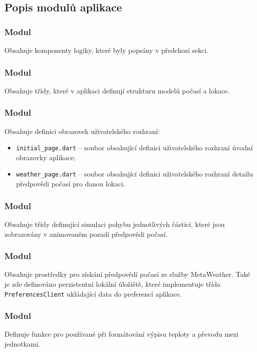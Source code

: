 \documentclass[12pt, a4paper]{article}
\begin{document}
\subsection{Popis modulů aplikace}

\subsubsection{Modul }
Obsahuje komponenty logiky, které byly popsány v předchozí sekci.

\subsubsection{Modul }
Obsahuje třídy, které v aplikaci definují strukturu modelů počasí a lokace.

\subsubsection{Modul }
Obsahuje definici obrazovek uživatelského rozhraní:

\begin{itemize}
	\item \texttt{initial\_page.dart} -- soubor obsahující definici uživatelského rozhraní úvodní obrazovky aplikace;
	\item \texttt{weather\_page.dart} -- soubor obsahující definici uživatelského rozhraní detailu předpovědi počasí pro danou lokaci.
\end{itemize}

\subsubsection{Modul }
Obsahuje třídy definující simulaci pohybu jednotlivých částicí, které jsou zobrazovány v animovaném pozadí předpovědi počasí.

\subsubsection{Modul }
Obsahuje prostředky pro získání předpovědí počasí ze služby MetaWeather. Také je zde definováno perzistentní lokální úložiště, které implementuje třída \texttt{PreferencesClient} ukládající data do preferencí aplikace.

\subsubsection{Modul }
Definuje funkce pro používané při formátování výpisu teploty a převodu mezi jednotkami.
\end{document}
